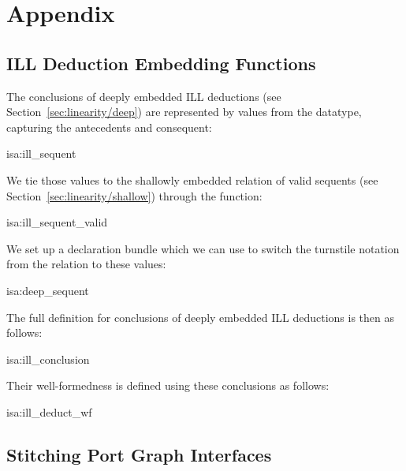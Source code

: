 \documentclass[class=smolathesis,crop=false]{standalone}
\begin{document}
\chapter{Appendix}
\label{ch:appendix}

\section{ILL Deduction Embedding Functions}
\label{app:ill-deduct}

The conclusions of deeply embedded ILL deductions (see Section~\ref{sec:linearity/deep}) are represented by values from the  datatype, capturing the antecedents and consequent:
\begin{isadef}{isa:ill_sequent}
  
\end{isadef}

We tie those values to the shallowly embedded relation of valid sequents (see Section~\ref{sec:linearity/shallow}) through the  function:
\begin{isadef}{isa:ill_sequent_valid}
  
\end{isadef}

We set up a declaration bundle  which we can use to switch the turnstile notation from the relation to these values:
\begin{isadef}{isa:deep_sequent}
  
\end{isadef}

The full definition for conclusions of deeply embedded ILL deductions is then as follows:
\begin{isadef}{isa:ill_conclusion}
  
\end{isadef}

Their well-formedness is defined using these conclusions as follows:
\begin{isadef}{isa:ill_deduct_wf}
  
\end{isadef}

\section{Stitching Port Graph Interfaces}
\label{app:seqInterfaceEdges}
\end{document}
